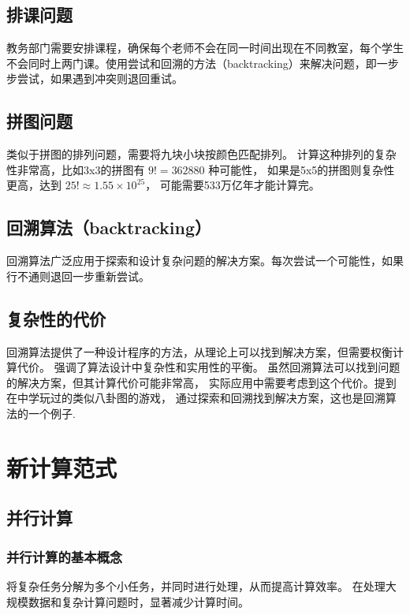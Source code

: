 \documentclass[UTF-8,a4paper,9pt]{article}
\begin{document}
\subsection{排课问题}

教务部门需要安排课程，确保每个老师不会在同一时间出现在不同教室，每个学生不会同时上两门课。使用尝试和回溯的方法（backtracking）来解决问题，即一步步尝试，如果遇到冲突则退回重试。

\subsection{拼图问题}

类似于拼图的排列问题，需要将九块小块按颜色匹配排列。
计算这种排列的复杂性非常高，比如3x3的拼图有 $9! = 362880$ 种可能性，
如果是5x5的拼图则复杂性更高，达到 $25! \approx 1.55 \times 10^{25}$，
可能需要533万亿年才能计算完。

\subsection{回溯算法（backtracking）}

回溯算法广泛应用于探索和设计复杂问题的解决方案。每次尝试一个可能性，如果行不通则退回一步重新尝试。

\subsection{复杂性的代价}
回溯算法提供了一种设计程序的方法，从理论上可以找到解决方案，但需要权衡计算代价。
强调了算法设计中复杂性和实用性的平衡。
虽然回溯算法可以找到问题的解决方案，但其计算代价可能非常高，
实际应用中需要考虑到这个代价。提到在中学玩过的类似八卦图的游戏，
通过探索和回溯找到解决方案，这也是回溯算法的一个例子.

\section{新计算范式}

\subsection{并行计算}

\subsubsection{并行计算的基本概念}

将复杂任务分解为多个小任务，并同时进行处理，从而提高计算效率。
在处理大规模数据和复杂计算问题时，显著减少计算时间。
\end{document}
